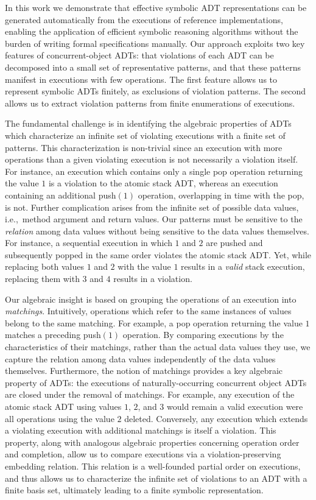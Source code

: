 In this work we demonstrate that effective symbolic ADT representations can be
generated automatically from the executions of reference implementations,
enabling the application of efficient symbolic reasoning algorithms
without the burden of writing formal specifications manually. Our approach
exploits two key features of concurrent-object ADTs: that violations of each
ADT can be decomposed into a small set of representative patterns, and that
these patterns manifest in executions with few operations. The first feature
allows us to represent symbolic ADTs finitely, as exclusions of violation
patterns. The second allows us to extract violation patterns from finite
enumerations of executions.

The fundamental challenge is in identifying the algebraic properties of ADTs
which characterize an infinite set of violating executions with a
finite set of patterns. This characterization is non-trivial since an execution
with more operations than a given violating execution is not necessarily a
violation itself. For instance, an execution which contains only a single
pop operation returning the value $1$ is a violation to the atomic stack
ADT, whereas an execution containing an additional push$(1)$ operation,
overlapping in time with the pop, is not. Further complication arises
from the infinite set of possible data values, i.e.,~method argument and return
values. Our patterns must be sensitive to the \emph{relation} among data values
without being sensitive to the data values themselves. For instance, a
sequential execution in which $1$ and $2$ are pushed and subsequently
popped in the same order violates the atomic stack ADT. Yet, while replacing
both values $1$ and $2$ with the value $1$ results in a
\emph{valid} stack execution, replacing them with $3$ and $4$ results
in a violation.

Our algebraic insight is based on grouping the operations of an execution into
\emph{matchings}. Intuitively, operations which refer to the same instances of
values belong to the same matching. For example, a pop operation
returning the value $1$ matches a preceding push$(1)$ operation. By
comparing executions by the characteristics of their matchings, rather than the
actual data values they use, we capture the relation among data values
independently of the data values themselves. Furthermore, the notion of
matchings provides a key algebraic property of ADTs: the executions of
naturally-occurring concurrent object ADTs are closed under the removal of
matchings. For example, any execution of the atomic stack ADT using values
$1$, $2$, and $3$ would remain a valid execution were all operations
using the value $2$ deleted. Conversely, any execution which extends a
violating execution with additional matchings is itself a violation. This
property, along with analogous algebraic properties concerning operation order
and completion, allow us to compare executions via a violation-preserving
embedding relation. This relation is a well-founded partial order on
executions, and thus allows us to characterize the infinite set of violations
to an ADT with a finite basis set, ultimately leading to a finite symbolic
representation.

